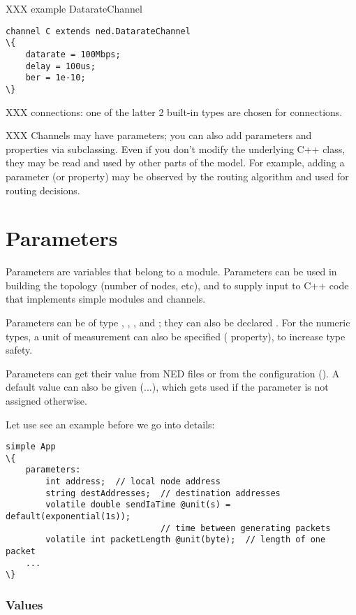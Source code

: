 XXX example DatarateChannel

\begin{Verbatim}[commandchars=\\\{\}]
channel C extends ned.DatarateChannel
\{
    datarate = 100Mbps;
    delay = 100us;
    ber = 1e-10;
\}
\end{Verbatim}

XXX connections: one of the latter 2 built-in types are chosen for connections.

XXX Channels may have parameters; you can also add parameters and properties
via subclassing. Even if you don't modify the underlying C++ class,
they may be read and used by other parts of the model. For example,
adding a  parameter (or  property) may be observed
by the routing algorithm and used for routing decisions.


\section{Parameters}

Parameters are variables that belong to a module. Parameters can be
used in building the topology (number of nodes, etc), and to supply
input to C++ code that implements simple modules and channels.

Parameters can be of type , ,
,  and ; they can also
be declared . For the numeric types, a unit of
measurement can also be specified ( property), to increase
type safety.

Parameters can get their value from NED files or from the configuration
(). A default value can also be given (...\ttt{)}),
which gets used if the parameter is not assigned otherwise.

Let use see an example before we go into details:

\begin{Verbatim}[commandchars=\\\{\}]
simple App
\{
    parameters:
        int address;  // local node address
        string destAddresses;  // destination addresses
        volatile double sendIaTime @unit(s) = default(exponential(1s));
                               // time between generating packets
        volatile int packetLength @unit(byte);  // length of one packet
    ...
\}
\end{Verbatim}

\subsubsection{Values}

